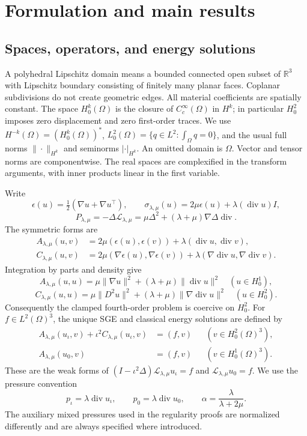 \documentclass[11pt,a4paper]{article}
\theoremstyle{remark}
\numberwithin{equation}{section}
\begin{document}
\section{Formulation and main results}\label{sec:main}

\subsection{Spaces, operators, and energy solutions}

A polyhedral Lipschitz domain means a bounded connected open subset of
\(\mathbb R^3\) with Lipschitz boundary consisting of finitely many
planar faces. Coplanar subdivisions do not create geometric edges.
All material coefficients are spatially constant. The space
\(H^k_0(\Omega)\) is the closure of \(C_c^\infty(\Omega)\) in \(H^k\);
in particular \(H^2_0\) imposes zero displacement and zero first-order
traces. We use \(H^{-k}(\Omega)=(H^k_0(\Omega))^*\),
\(L^2_0(\Omega)=\{q\in L^2:\int_\Omega q=0\}\), and the usual full
norms \(\|\cdot\|_{H^k}\) and seminorms \(|\cdot|_{H^k}\).
An omitted domain is \(\Omega\). Vector and tensor norms are componentwise.
The real spaces are complexified in the transform arguments, with
inner products linear in the first variable.

Write
\[
 \epsilon(u)=\tfrac12(\nabla u+\nabla u^\top),\qquad
 \sigma_{\lambda,\mu}(u)=2\mu\epsilon(u)
                      +\lambda(\operatorname{div}u)I,
\]
\[
 P_{\lambda,\mu}=-\Delta\mathcal L_{\lambda,\mu}
 =\mu\Delta^2+(\lambda+\mu)\nabla\Delta\operatorname{div}.
\]
The symmetric forms are
\begin{align}
 A_{\lambda,\mu}(u,v)
 &=2\mu(\epsilon(u),\epsilon(v))
                  +\lambda(\operatorname{div}u,\operatorname{div}v),\\
 C_{\lambda,\mu}(u,v)
 &=2\mu(\nabla\epsilon(u),\nabla\epsilon(v))
                  +\lambda(\nabla\operatorname{div}u,\nabla\operatorname{div}v).
\end{align}
Integration by parts and density give
\[
 A_{\lambda,\mu}(u,u)
 =\mu\|\nabla u\|^2+(\lambda+\mu)\|\operatorname{div}u\|^2
 \quad(u\in H^1_0),
\]
\[
 C_{\lambda,\mu}(u,u)
 =\mu\|D^2u\|^2+(\lambda+\mu)\|\nabla\operatorname{div}u\|^2
 \quad(u\in H^2_0).
\]
Consequently the clamped fourth-order problem is coercive on \(H^2_0\).
For \(f\in L^2(\Omega)^3\), the unique SGE and classical energy solutions
are defined by
\begin{align}
 A_{\lambda,\mu}(u_\iota,v)+\iota^2C_{\lambda,\mu}(u_\iota,v)
  &=(f,v) &&(v\in H^2_0(\Omega)^3),\label{eq:main-sge}\\
 A_{\lambda,\mu}(u_0,v)&=(f,v)
               &&(v\in H^1_0(\Omega)^3).\label{eq:main-classical}
\end{align}
These are the weak forms of
\((I-\iota^2\Delta)\mathcal L_{\lambda,\mu}u_\iota=f\) and
\(\mathcal L_{\lambda,\mu}u_0=f\).
We use the pressure convention
\[
 p_\iota=\lambda\operatorname{div}u_\iota,\qquad
 p_0=\lambda\operatorname{div}u_0,\qquad
 \alpha=\frac{\lambda}{\lambda+2\mu}.
\]
The auxiliary mixed pressures used in the regularity proofs are
normalized differently and are always specified where introduced.
\end{document}
